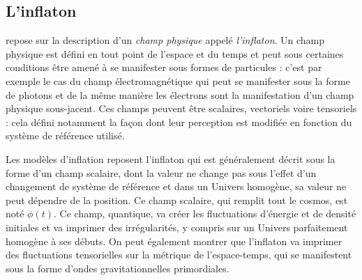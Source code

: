 \subsection{L'inflaton}
 repose sur la description d'un \textit{champ physique} appelé \textit{l'inflaton}. Un champ physique est défini en tout point de l'espace et du temps et peut sous certaines conditions être amené à se manifester sous formes de particules : c'est par exemple le cas du champ électromagnétique qui peut se manifester sous la forme de photons et de la même manière les électrons sont la manifestation d'un champ physique sous-jacent. Ces champs peuvent être scalaires, vectoriels voire tensoriels : cela défini notamment la façon dont leur perception est modifiée en fonction du système de référence utilisé.

Les modèles d'inflation reposent l'inflaton qui est généralement décrit sous la forme d'un champ scalaire, dont la valeur ne change pas sous l'effet d'un changement de système de référence et dans un Univers homogène, sa valeur ne peut dépendre de la position. Ce champ scalaire, qui remplit tout le cosmos, est noté $\phi(t)$. Ce champ, quantique, va créer les fluctuations d'énergie et de densité initiales et va imprimer des irrégularités, y compris sur un Univers parfaitement homogène à ses débuts. On peut également montrer que l'inflaton va imprimer des fluctuations tensorielles sur la métrique de l'espace-temps, qui se manifestent sous la forme d'ondes gravitationnelles primordiales.

